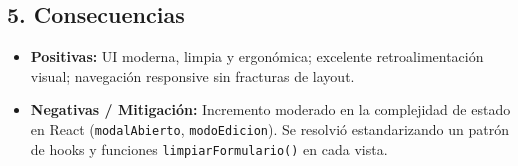 \documentclass[11pt,a4paper]{article}
\begin{document}
\subsection{5. Consecuencias}
\begin{itemize}[leftmargin=*]
    \item \textbf{Positivas:} UI moderna, limpia y ergonómica; excelente retroalimentación visual; navegación responsive sin fracturas de layout.
    \item \textbf{Negativas / Mitigación:} Incremento moderado en la complejidad de estado en React (\texttt{modalAbierto}, \texttt{modoEdicion}). Se resolvió estandarizando un patrón de hooks y funciones \texttt{limpiarFormulario()} en cada vista.
\end{itemize}
\end{document}

